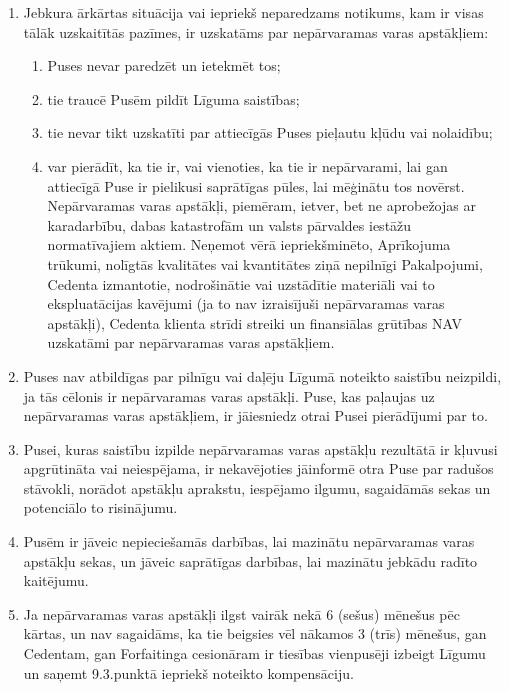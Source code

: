 \documentclass[a4paper]{article}
\begin{document}
\begin{multicols}{2}
  \begin{enumerate}
  \item{Jebkura ārkārtas situācija vai iepriekš neparedzams notikums, kam ir
visas tālāk uzskaitītās pazīmes, ir uzskatāms par nepārvaramas varas
apstākļiem:}

    \begin{enumerate}
    \item{Puses nevar paredzēt un ietekmēt tos;}

    \item{tie traucē Pusēm pildīt Līguma saistības;}

    \item{tie nevar tikt uzskatīti par attiecīgās Puses pieļautu kļūdu vai
nolaidību; }

    \item{var pierādīt, ka tie ir, vai vienoties, ka tie ir nepārvarami,
lai gan attiecīgā Puse ir pielikusi saprātīgas pūles, lai mēģinātu tos novērst.
Nepārvaramas varas apstākļi, piemēram, ietver, bet ne aprobežojas
ar karadarbību, dabas katastrofām un valsts pārvaldes iestāžu
normatīvajiem aktiem. Neņemot vērā iepriekšminēto, Aprīkojuma
trūkumi, nolīgtās kvalitātes vai kvantitātes ziņā nepilnīgi
Pakalpojumi, Cedenta izmantotie, nodrošinātie vai uzstādītie
materiāli vai to ekspluatācijas kavējumi (ja to nav izraisījuši
nepārvaramas varas apstākļi), Cedenta klienta strīdi streiki un
finansiālas grūtības NAV uzskatāmi par nepārvaramas varas
apstākļiem.}
    \end{enumerate}

  \item{Puses nav atbildīgas par pilnīgu vai daļēju Līgumā noteikto saistību
neizpildi, ja tās cēlonis ir nepārvaramas varas apstākļi. Puse, kas
paļaujas uz nepārvaramas varas apstākļiem, ir jāiesniedz otrai Pusei
pierādījumi par to.}

  \item{Pusei, kuras saistību izpilde nepārvaramas varas apstākļu rezultātā ir
kļuvusi apgrūtināta vai neiespējama, ir nekavējoties jāinformē otra
Puse par radušos stāvokli, norādot apstākļu aprakstu, iespējamo
ilgumu, sagaidāmās sekas un potenciālo to risinājumu.}

  \item{Pusēm ir jāveic nepieciešamās darbības, lai mazinātu nepārvaramas
varas apstākļu sekas, un jāveic saprātīgas darbības, lai mazinātu
jebkādu radīto kaitējumu.}

  \item{Ja nepārvaramas varas apstākļi ilgst vairāk nekā 6 (sešus) mēnešus
pēc kārtas, un nav sagaidāms, ka tie beigsies vēl nākamos 3 (trīs)
mēnešus, gan Cedentam, gan Forfaitinga cesionāram ir tiesības
vienpusēji izbeigt Līgumu un saņemt 9.3.punktā iepriekš noteikto
kompensāciju.}
  \end{enumerate}


\end{multicols}
\end{document}
